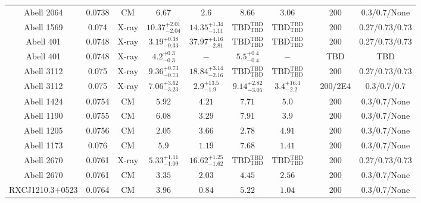 \begin{table}
\begin{tabular}{cccccccccc}
Abell 2064 & 0.0738 & CM & ${6.67}^{}_{}$ & ${2.6}^{}_{}$ & ${8.66}^{}_{}$ & ${3.06}^{}_{}$ & \citet{RI06.1} & 200 & 0.3/0.7/None \\
Abell 1569 & 0.074 & X-ray & ${10.37}^{+2.01}_{-2.04}$ & ${14.35}^{+1.34}_{-1.11}$ & ${\mathrm{TBD}}^{\mathrm{TBD}}_{\mathrm{TBD}}$ & ${\mathrm{TBD}}^{\mathrm{TBD}}_{\mathrm{TBD}}$ & \citet{BA14.1} & 200 & 0.27/0.73/0.73 \\
Abell 401 & 0.0748 & X-ray & ${3.19}^{+0.38}_{-0.33}$ & ${37.97}^{+4.16}_{-2.81}$ & ${\mathrm{TBD}}^{\mathrm{TBD}}_{\mathrm{TBD}}$ & ${\mathrm{TBD}}^{\mathrm{TBD}}_{\mathrm{TBD}}$ & \citet{BA14.1} & 200 & 0.27/0.73/0.73 \\
Abell 401 & 0.0748 & X-ray & ${4.2}^{+0.3}_{-0.3}$ & ${-}^{}_{}$ & ${5.5}^{+0.4}_{-0.4}$ & ${-}^{}_{}$ & \citet{XU01.1} & TBD & TBD \\
Abell 3112 & 0.075 & X-ray & ${9.36}^{+0.73}_{-0.73}$ & ${18.84}^{+3.14}_{-2.16}$ & ${\mathrm{TBD}}^{\mathrm{TBD}}_{\mathrm{TBD}}$ & ${\mathrm{TBD}}^{\mathrm{TBD}}_{\mathrm{TBD}}$ & \citet{BA14.1} & 200 & 0.27/0.73/0.73 \\
Abell 3112 & 0.075 & X-ray & ${7.06}^{+3.62}_{-3.23}$ & ${2.9}^{+13.5}_{-1.9}$ & ${9.14}^{+2.82}_{-3.05}$ & ${3.4}^{+16.4}_{-2.2}$ & \citet{VO06.1} & 200/2E4 & 0.3/0.7/0.7 \\
Abell 1424 & 0.0754 & CM & ${5.92}^{}_{}$ & ${4.21}^{}_{}$ & ${7.71}^{}_{}$ & ${5.0}^{}_{}$ & \citet{RI06.1} & 200 & 0.3/0.7/None \\
Abell 1190 & 0.0755 & CM & ${6.08}^{}_{}$ & ${3.29}^{}_{}$ & ${7.91}^{}_{}$ & ${3.9}^{}_{}$ & \citet{RI06.1} & 200 & 0.3/0.7/None \\
Abell 1205 & 0.0756 & CM & ${2.05}^{}_{}$ & ${3.66}^{}_{}$ & ${2.78}^{}_{}$ & ${4.91}^{}_{}$ & \citet{RI06.1} & 200 & 0.3/0.7/None \\
Abell 1173 & 0.076 & CM & ${5.9}^{}_{}$ & ${1.19}^{}_{}$ & ${7.68}^{}_{}$ & ${1.41}^{}_{}$ & \citet{RI06.1} & 200 & 0.3/0.7/None \\
Abell 2670 & 0.0761 & X-ray & ${5.33}^{+1.11}_{-1.09}$ & ${16.62}^{+1.25}_{-1.62}$ & ${\mathrm{TBD}}^{\mathrm{TBD}}_{\mathrm{TBD}}$ & ${\mathrm{TBD}}^{\mathrm{TBD}}_{\mathrm{TBD}}$ & \citet{BA14.1} & 200 & 0.27/0.73/0.73 \\
Abell 2670 & 0.0761 & CM & ${3.35}^{}_{}$ & ${2.03}^{}_{}$ & ${4.45}^{}_{}$ & ${2.56}^{}_{}$ & \citet{RI06.1} & 200 & 0.3/0.7/None \\
RXCJ1210.3+0523 & 0.0764 & CM & ${3.96}^{}_{}$ & ${0.84}^{}_{}$ & ${5.22}^{}_{}$ & ${1.04}^{}_{}$ & \citet{RI06.1} & 200 & 0.3/0.7/None \\

\end{tabular}
\end{table}
